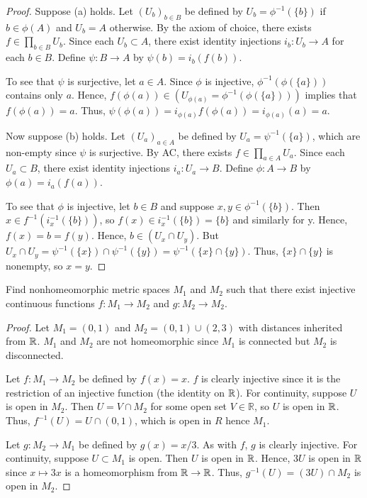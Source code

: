 \documentclass{article}
\begin{document}
\begin{proof}
Suppose (a) holds.  Let $(U_b)_{b \in B}$ be defined by $U_b = \phi^{-1}(\{b\})$ if $b \in \phi(A)$ and $U_b = A$ otherwise.  By the axiom of choice, there exists $f \in \prod_{b \in B} U_b$. Since each $U_b \subset A$, there exist identity injections $i_b:U_b \to A$ for each $b \in B$.  Define $\psi: B \to A$ by $\psi(b) = i_b(f(b))$.

To see that $\psi$ is surjective, let $a \in A$.  Since $\phi$ is injective, $\phi^{-1}(\phi(\{a\}))$ contains only $a$.  Hence, $f(\phi(a)) \in (U_{\phi(a)} = \phi^{-1}(\phi(\{a\})))$ implies that $f(\phi(a)) = a$. Thus, $\psi(\phi(a)) = i_{\phi(a)} f(\phi(a)) = i_{\phi(a)}(a) = a$.

Now suppose (b) holds. Let $(U_a)_{a \in A}$ be defined by $U_a = \psi^{-1}(\{a\})$, which are non-empty since $\psi$ is surjective.   By AC, there exists $f \in \prod_{a \in A} U_a$.  Since each $U_a \subset B$, there exist identity injections $i_a:U_a \to B$.  Define $\phi: A \to B$ by $\phi(a) = i_a(f(a))$.

To see that $\phi$ is injective, let $b \in B$ and suppose $x, y \in \phi^{-1}(\{b\})$. Then $x \in f^{-1}(i_x^{-1}(\{b\}))$, so $f(x) \in i_x^{-1}(\{b\}) = \{b\}$ and similarly for y.  Hence, $f(x) = b = f(y)$.  Hence, $b \in (U_x \cap U_y)$. But $U_x \cap U_y = \psi^{-1}(\{x\}) \cap \psi^{-1}(\{y\}) = \psi^{-1}(\{x\} \cap \{y\})$.  Thus, $\{x\} \cap \{y\}$ is nonempty, so $x = y$.

\end{proof}

 Find nonhomeomorphic metric spaces $M_1$ and $M_2$ such that there exist injective continuous functions $f:M_1 \to M_2$ and $g: M_2 \to M_2$.
\begin{proof}
Let $M_1 = (0,1)$ and $M_2 = (0,1) \cup (2,3)$ with distances inherited from $\mathbb{R}$.  $M_1$ and $M_2$ are not homeomorphic since $M_1$ is connected but $M_2$ is disconnected. %

Let $f:M_1 \to M_2$ be defined by $f(x) = x$. $f$ is clearly injective since it is the restriction of an injective function (the identity on $\mathbb{R}$).  For continuity, suppose $U$ is open in $M_2$. Then $U = V \cap M_2$ for some open set $V \in \mathbb{R}$, so $U$ is open in $\mathbb{R}$. Thus, $f^{-1}(U) = U \cap (0,1)$, which is open in $R$ hence $M_1$.

Let $g:M_2 \to M_1$ be defined by $g(x) = x/3$. As with $f$, $g$ is clearly injective. For continuity, suppose $U \subset M_1$ is open.  Then $U$ is open in $\mathbb{R}$. Hence, $3U$ is open in $\mathbb{R}$ since $x \mapsto 3x$ is a homeomorphism from $\mathbb{R} \to \mathbb{R}$.  Thus, $g^{-1}(U) = (3U) \cap M_2$ is open in $M_2$.
\end{proof}
\end{document}
